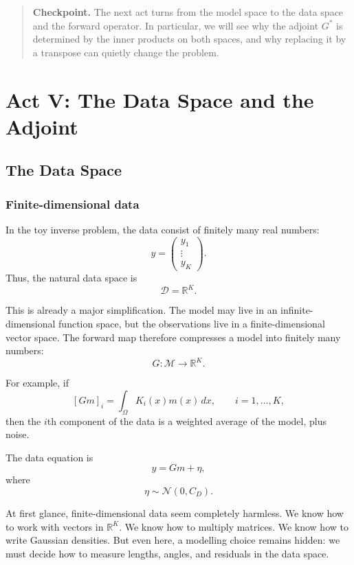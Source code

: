 \documentclass[11pt,a4paper]{book}
\newenvironment{checkpoint}
  {\begin{quote}\textbf{Checkpoint.}}
  {\end{quote}}
\newcommand{\M}{\mathcal{M}}      %
\newcommand{\D}{\mathcal{D}}      %
\newcommand{\R}{\mathbb{R}}
\newcommand{\noise}{\eta}
\newcommand{\obs}{y}
\newcommand{\G}{G}
\newcommand{\Gadj}{G^\ast}
\begin{document}
\begin{checkpoint}
The next act turns from the model space to the data space and the forward
operator. In particular, we will see why the adjoint $\Gadj$ is determined by
the inner products on both spaces, and why replacing it by a transpose can
quietly change the problem.
\end{checkpoint}

\part{Act V: The Data Space and the Adjoint}

\chapter{The Data Space}

\section{Finite-dimensional data}

In the toy inverse problem, the data consist of finitely many real numbers:
\[
    \obs =
    \begin{pmatrix}
        y_1\\
        \vdots\\
        y_K
    \end{pmatrix}.
\]
Thus, the natural data space is
\[
    \D = \R^K.
\]

This is already a major simplification. The model may live in an
infinite-dimensional function space, but the observations live in a
finite-dimensional vector space. The forward map therefore compresses a model
into finitely many numbers:
\[
    \G : \M \to \R^K.
\]

For example, if
\[
    [\G m]_i
    =
    \int_\Omega K_i(x)m(x)\,dx,
    \qquad
    i=1,\ldots,K,
\]
then the $i$th component of the data is a weighted average of the model, plus
noise.

The data equation is
\[
    \obs = \G m + \noise,
\]
where
\[
    \noise \sim \mathcal{N}(0,C_D).
\]

At first glance, finite-dimensional data seem completely harmless. We know how
to work with vectors in $\R^K$. We know how to multiply matrices. We know how to
write Gaussian densities. But even here, a modelling choice remains hidden:
we must decide how to measure lengths, angles, and residuals in the data space.
\end{document}
